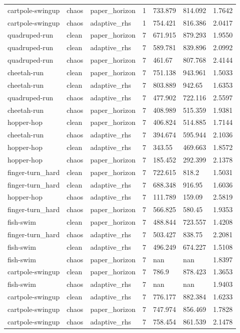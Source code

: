 \begin{tabular}{lllllll}
cartpole-swingup & chaos & paper\_horizon & 1 & 733.879 & 814.092 & 1.7642 \\
cartpole-swingup & chaos & adaptive\_rhs & 1 & 754.421 & 816.386 & 2.0417 \\
quadruped-run & clean & paper\_horizon & 7 & 671.915 & 879.293 & 1.9550 \\
quadruped-run & clean & adaptive\_rhs & 7 & 589.781 & 839.896 & 2.0992 \\
quadruped-run & chaos & paper\_horizon & 7 & 461.67 & 807.768 & 2.4144 \\
cheetah-run & clean & paper\_horizon & 7 & 751.138 & 943.961 & 1.5033 \\
cheetah-run & clean & adaptive\_rhs & 7 & 803.889 & 942.65 & 1.6353 \\
quadruped-run & chaos & adaptive\_rhs & 7 & 477.902 & 722.116 & 2.5597 \\
cheetah-run & chaos & paper\_horizon & 7 & 408.989 & 515.359 & 1.9381 \\
hopper-hop & clean & paper\_horizon & 7 & 406.824 & 514.885 & 1.7144 \\
cheetah-run & chaos & adaptive\_rhs & 7 & 394.674 & 595.944 & 2.1036 \\
hopper-hop & clean & adaptive\_rhs & 7 & 343.55 & 469.663 & 1.8572 \\
hopper-hop & chaos & paper\_horizon & 7 & 185.452 & 292.399 & 2.1378 \\
finger-turn\_hard & clean & paper\_horizon & 7 & 722.615 & 818.2 & 1.5031 \\
finger-turn\_hard & clean & adaptive\_rhs & 7 & 688.348 & 916.95 & 1.6036 \\
hopper-hop & chaos & adaptive\_rhs & 7 & 111.789 & 159.09 & 2.5819 \\
finger-turn\_hard & chaos & paper\_horizon & 7 & 566.825 & 580.45 & 1.9353 \\
fish-swim & clean & paper\_horizon & 7 & 488.844 & 723.557 & 1.4208 \\
finger-turn\_hard & chaos & adaptive\_rhs & 7 & 503.427 & 838.75 & 2.2081 \\
fish-swim & clean & adaptive\_rhs & 7 & 496.249 & 674.227 & 1.5108 \\
fish-swim & chaos & paper\_horizon & 7 & nan & nan & 1.8397 \\
cartpole-swingup & clean & paper\_horizon & 7 & 786.9 & 878.423 & 1.3653 \\
fish-swim & chaos & adaptive\_rhs & 7 & nan & nan & 1.9403 \\
cartpole-swingup & clean & adaptive\_rhs & 7 & 776.177 & 882.384 & 1.6233 \\
cartpole-swingup & chaos & paper\_horizon & 7 & 747.974 & 856.469 & 1.7828 \\
cartpole-swingup & chaos & adaptive\_rhs & 7 & 758.454 & 861.539 & 2.1478 \\
\bottomrule
\end{tabular}
